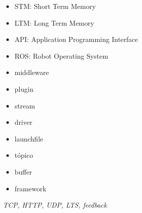 \begin{glosario}\label{chapter:glosario}




\begin{itemize}
\item STM: Short Term Memory
\item LTM: Long Term Memory
\item API: Application Programming Interface
\item ROS: Robot Operating System
\item middleware
\item plugin
\item stream
\item driver
\item launchfile
\item tópico
\item buffer
\item framework
\end{itemize}

\textit{TCP, HTTP, UDP, LTS, feedback}

\end{glosario}	
